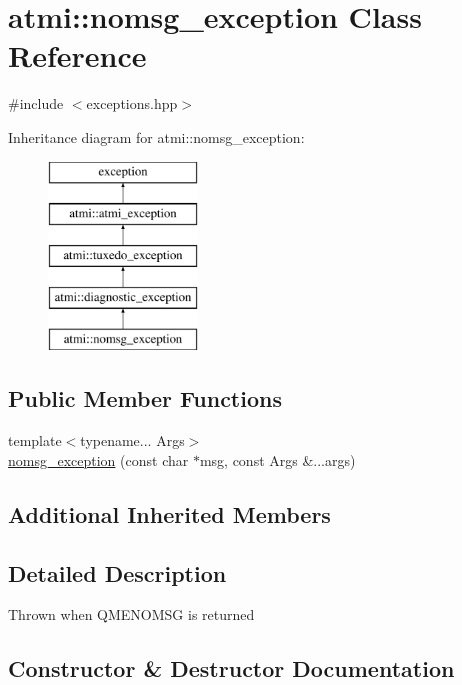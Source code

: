 \hypertarget{classatmi_1_1nomsg__exception}{}\section{atmi\+:\+:nomsg\+\_\+exception Class Reference}
\label{classatmi_1_1nomsg__exception}


{\ttfamily \#include $<$exceptions.\+hpp$>$}

Inheritance diagram for atmi\+:\+:nomsg\+\_\+exception\+:\begin{figure}[H]
\begin{center}
\leavevmode
\includegraphics[height=5.000000cm]{classatmi_1_1nomsg__exception}
\end{center}
\end{figure}
\subsection*{Public Member Functions}
\begin{DoxyCompactItemize}
\item 
{\footnotesize template$<$typename... Args$>$ }\\\hyperlink{classatmi_1_1nomsg__exception_adf4039103c33fa16b63242cb7e129664}{nomsg\+\_\+exception} (const char $\ast$msg, const Args \&...args)
\end{DoxyCompactItemize}
\subsection*{Additional Inherited Members}


\subsection{Detailed Description}
Thrown when Q\+M\+E\+N\+O\+M\+SG is returned 

\subsection{Constructor \& Destructor Documentation}
